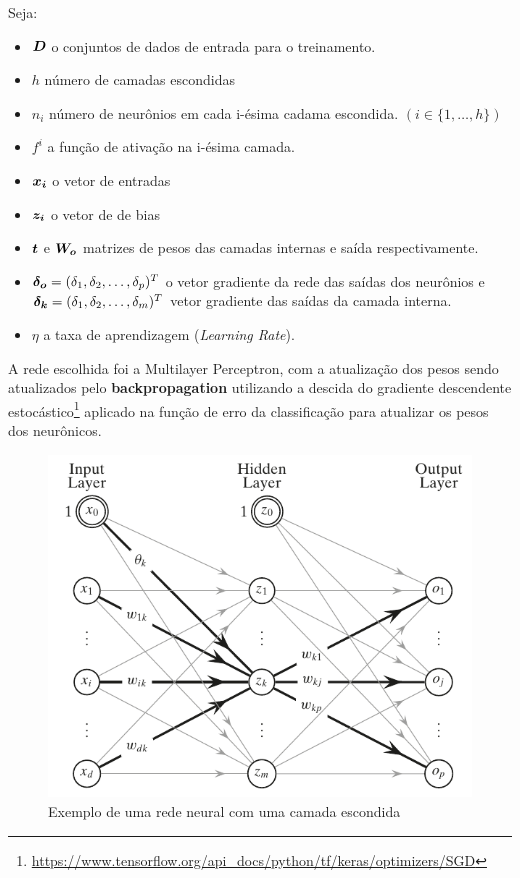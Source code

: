 Seja:
\begin{itemize}
    \item $\boldsymbol{D}$ o conjuntos de dados de entrada para o treinamento.
    \item $h$ número de camadas escondidas
    \item $n_i$ número de neurônios em cada i-ésima cadama escondida. $(i \in \{1,\dots, h\})$
    \item $f^{i}$ a função de ativação na i-ésima camada. 
    \item $\boldsymbol{x_i}$ o vetor de entradas
    \item $\boldsymbol{z_i}$ o vetor de de bias
    \item $\boldsymbol{t}$ e $\boldsymbol{W_o}$ matrizes de pesos das camadas internas e saída respectivamente.
    \item $\boldsymbol{\delta_o} = (\delta_1, \delta_2, \dots, \delta_p)^{T}$ o vetor gradiente da rede das saídas dos neurônios e $\boldsymbol{\delta_k} = (\delta_1, \delta_2, \dots, \delta_m)^{T}$ vetor gradiente das saídas da camada interna.
    \item $\eta$ a taxa de aprendizagem (\textit{Learning Rate}).
\end{itemize}

A rede escolhida foi a Multilayer Perceptron, com a atualização dos pesos sendo atualizados pelo \textbf{backpropagation} utilizando a descida do gradiente descendente estocástico\footnote{\url{https://www.tensorflow.org/api_docs/python/tf/keras/optimizers/SGD}} aplicado na função de erro da classificação para atualizar os pesos dos neurônicos.


\begin{figure}[H]
  \centering
  \includegraphics{pdf/NeuralNetwork.pdf}
  \caption{Exemplo de uma rede neural com uma camada escondida}
  \label{fig:neuralnetwork}
\end{figure}

